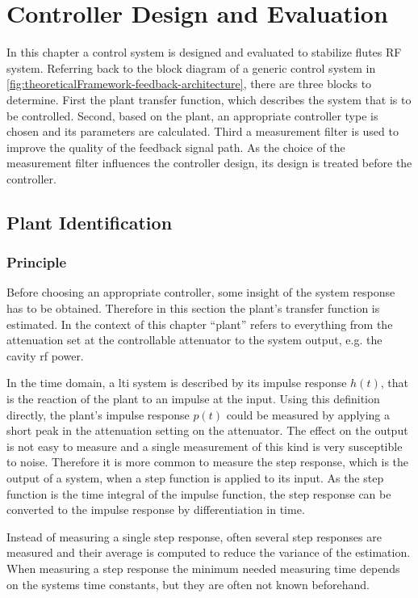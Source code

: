 \chapter{Controller Design and Evaluation}
In this chapter a control system is designed and evaluated to stabilize \gls{flute}s RF system.
Referring back to the block diagram of a generic control system in \autoref{fig:theoreticalFramework-feedback-architecture}, there are three blocks to determine.
First the plant transfer function, which describes the system that is to be controlled.
Second, based on the plant, an appropriate controller type is chosen and its parameters are calculated.
Third a measurement filter is used to improve the quality of the feedback signal path. As the choice of the measurement filter influences the controller design, its design is treated before the controller.

\section{Plant Identification}\label{sec:plantIdenti}
\subsection{Principle}
Before choosing an appropriate controller, some insight of the system response has to be obtained. Therefore in this section the plant's transfer function is estimated. In the context of this chapter ``plant'' refers to everything from the attenuation set at the controllable attenuator to the system output, e.g. the cavity \gls{rf} power.

In the time domain, a \gls{lti} system is described by its impulse response $h(t)$, that is the reaction of the plant to an impulse at the input.
Using this definition directly, the plant's impulse response $p(t)$ could be measured by applying a short peak in the attenuation setting on the attenuator. The effect on the output is not easy to measure and a single measurement of this kind is very susceptible to noise.
Therefore it is more common to measure the step response\cite{Wang2000}, which is the output of a system, when a step function is applied to its input. As the step function is the time integral of the impulse function, the step response can be converted to the impulse response by differentiation in time.

Instead of measuring a single step response, often several step responses are measured and their average is computed to reduce the variance of the estimation. When measuring a step response the minimum needed measuring time depends on the systems time constants, but they are often not known beforehand.

